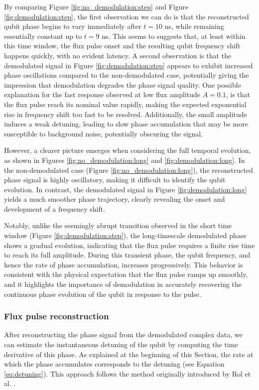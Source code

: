 By comparing Figure \ref{fig:no_demodulation:step} and Figure \ref{fig:demodulation:step}, the first observation we can do is that the reconstructed qubit phase begins to vary immediately after $t=10$ ns, while remaining essentially constant up to $t=9$ ns. 
This seems to suggests that, at least within this time window, the flux pulse onset and the resulting qubit frequency shift happens quickly, with no evident latency.
A second observation is that the demodulated signal in Figure \ref{fig:demodulation:step} appears to exhibit increased phase oscillations compared to the non-demodulated case, potentially giving the impression that demodulation degrades the phase signal quality. 
One possible explanation for the fast response observed at low flux amplitude $A = 0.1$, is that the flux pulse reach its nominal value rapidly, making the expected exponential rise in frequency shift too fast to be resolved. 
Additionally, the small amplitude induces a weak detuning, leading to slow phase accumulation that may be more susceptible to background noise, potentially obscuring the signal.

However, a clearer picture emerges when considering the full temporal evolution, as shown in Figures \ref{fig:no_demodulation:long} and \ref{fig:demodulation:long}. 
In the non-demodulated case (Figure \ref{fig:no_demodulation:long}), the reconstructed phase signal is highly oscillatory, making it difficult to identify the qubit evolution. 
In contrast, the demodulated signal in Figure \ref{fig:demodulation:long} yields a much smoother phase trajectory, clearly revealing the onset and development of a frequency shift.

Notably, unlike the seemingly abrupt transition observed in the short time window (Figure \ref{fig:demodulation:step}), the long-timescale demodulated phase shows a gradual evolution, indicating that the flux pulse requires a finite rise time to reach its full amplitude. 
During this transient phase, the qubit frequency, and hence the rate of phase accumulation, increases progressively. 
This behavior is consistent with the physical expectation that the flux pulse ramps up smoothly, and it highlights the importance of demodulation in accurately recovering the continuous phase evolution of the qubit in response to the pulse.

\subsubsection{Flux pulse reconstruction}
After reconstructing the phase signal from the demodulated complex data, we can estimate the instantaneous detuning of the qubit by computing the time derivative of this phase. 
As explained at the beginning of this Section, the rate at which the phase accumulates corresponds to the detuning (see Equation \ref{eq:detuning}). 
This approach follows the method originally introduced by Rol et al. \cite{Rol2020Cryoscope}.

